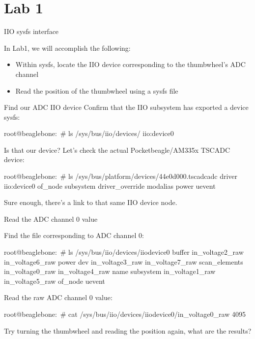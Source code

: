 \section{Lab 1}

\begin{frame}
   {IIO sysfs interface}

   In Lab1, we will accomplish the following:
	\begin{itemize}
		\item
			Within sysfs, locate the IIO device corresponding to the thumbwheel's ADC channel
		\item
			Read the position of the thumbwheel using a sysfs file
	\end{itemize}
\end{frame}

\begin{frame}
    {Find our ADC IIO device}
	Confirm that the IIO subsystem has exported a device sysfs:
	\begin{rawscriptsize}
root@beaglebone:~# ls /sys/bus/iio/devices/
iio:device0
	\end{rawscriptsize}

	Is that our device? Let's check the actual Pocketbeagle/AM335x TSCADC device:
	\begin{rawscriptsize}
root@beaglebone:~# ls /sys/bus/platform/devices/44e0d000.tscadc\:adc
driver           iio:device0  of_node  subsystem
driver_override  modalias     power    uevent
	\end{rawscriptsize}
	Sure enough, there's a link to that same IIO device node.
\end{frame}

\begin{frame}
    {Read the ADC channel 0 value}

	Find the file corresponding to ADC channel 0:
	\begin{rawscriptsize}
root@beaglebone:~# ls /sys/bus/iio/devices/iio\:device0
buffer           in_voltage2_raw  in_voltage6_raw  power
dev              in_voltage3_raw  in_voltage7_raw  scan_elements
in_voltage0_raw  in_voltage4_raw  name             subsystem
in_voltage1_raw  in_voltage5_raw  of_node          uevent
	\end{rawscriptsize}
	Read the raw ADC channel 0 value:
	\begin{rawscriptsize}
root@beaglebone:~# cat /sys/bus/iio/devices/iio\:device0/in_voltage0_raw
4095
	\end{rawscriptsize}
	Try turning the thumbwheel and reading the position again, what are the results?
\end{frame}

